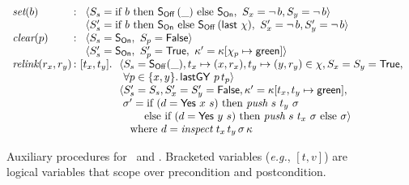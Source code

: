 \documentclass[a4paper,UKenglish]{lipics-v2016}
\newcommand{\eg}{\emph{e.g.}\xspace}
\newcommand{\aux}[1]{\textit{#1}}
\newcommand{\hist}{\chi}
\newcommand{\hpts}{\mapsto}
\newcommand{\ldot}{\mathord{.}\,}
\def\FF{\mathsf{False}}
\def\TT{\mathsf{True}}
\def\ordlist{\sigma}
\newcommand{\C}{\kappa}
\newcommand{\CP}{\kappa'}
\def\lgVy{\ensuremath{\mathsf{lastGY}}}
\newcommand{\sOn}{\mathsf{S_{On}}}
\newcommand{\sOff}{\mathsf{S_{Off}}}
\theoremstyle{definition}
\begin{document}
{\begin{figure}[t]
\hrulefill
%
\small
\[
\begin{array}{l@{\, :\ }l}
  \aux{set}(b) &
  \begin{array}[t]{l}
        \langle \sss = \textrm{if}\ b\ \textrm{then}\ \sOff\,(\_) \ 
        \textrm{else}\ \sOn,\ \sx = \neg\, b, \sy = \neg\, b \rangle\\
        \langle \sss' = \textrm{if}\ b\ \textrm{then}\ \sOn\ %
        \textrm{else}\ \sOff\,(\mathsf{last}\ \hist),\
         \sx' = \neg\, b, \sy' = \neg\, b \rangle
\end{array}\\[2.5pt] 
   \aux{clear}(p) &
  \begin{array}[t]{l}
   \langle\sss = \sOn,\ \spp = \FF \rangle\\
   \langle\sss' = \sOn,\ \spp' = \TT,\
     \CP = \C[\histp \hpts \mathsf{green}] \rangle
  \end{array}\\[2.5pt]
   \aux{relink}(r_x, r_y) & [t_x, t_y]\ldot
    \begin{array}[t]{l}
    \langle\sss = \sOff(\_), %
      t_x \hpts (x, r_x), t_y \hpts (y, r_y) \in \hist, \sx = \sy = \TT, \\
     \hphantom{\langle} \forall p \in \{x,y\}\ldot \lgVy\ p\, t_p \rangle\\
        \langle\sss' = \sss, \sx'= \sy'=\FF,%
        \CP = \C[t_x, t_y \hpts \mathsf{green}],\\
      \ \ordlist' = \textrm{if}\ (d = \mathsf{Yes}\ x\ s)\
                \textrm{then}\ \aux{push}\ s\ t_y\ \ordlist\\
                 \phantom{\ \ordlist =\ } \textrm{else\ if}\
                 (d = \mathsf{Yes}\ y\ s)\ \textrm{then}\
                 \aux{push}\ s\ t_x\ \ordlist\ \textrm{else}\ \ordlist\rangle\\
  \quad \mbox{where $d = \aux{inspect}\ t_x\, t_y\, \ordlist\, \C$}
  \end{array}
\end{array}
\]
\caption{\label{fig:auxcode} Auxiliary procedures for
\jywrite~and 
  \jyscan. Bracketed variables (\eg, $[t, v]$) are logical variables
  that scope over precondition and postcondition.}
\end{figure}
}
\end{document}
